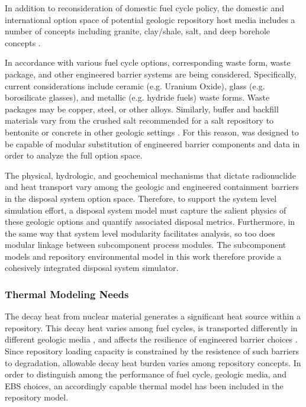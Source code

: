 

In addition to reconsideration of domestic fuel cycle policy, the domestic and 
international option space of potential geologic repository host media includes 
a number of concepts including granite, clay/shale, salt, and deep borehole 
concepts \cite{nutt_used_2010}. 


In accordance with various fuel cycle options, corresponding waste form, waste 
package, and other engineered barrier systems are being considered.  
Specifically, current considerations include ceramic (e.g.  Uranium Oxide), 
glass (e.g.  borosilicate glasses), and metallic (e.g.  hydride fuels) waste 
forms. Waste packages may be copper, steel, or other alloys. Similarly, buffer 
and backfill materials vary from the crushed salt recommended for a salt 
repository \cite{hardin_generic_2011} to bentonite or concrete in other 
geologic settings \cite{andra_argile:_2005}. For this reason, \Cyder
was designed to be capable of modular substitution of engineered barrier 
components and data in order to analyze the full option space.


The physical, hydrologic, and geochemical mechanisms that dictate 
radionuclide and heat transport vary among the geologic and engineered 
containment barriers in the disposal system option space.  Therefore, 
to support the system level simulation effort, a disposal system model must
capture the salient physics of these geologic options and quantify associated 
disposal metrics.  Furthermore, in the same way that system level 
modularity facilitates analysis, so too does modular linkage between subcomponent 
process modules. The subcomponent models and repository environmental model in 
this work therefore provide a cohesively integrated disposal system simulator.


\subsubsection{Thermal Modeling Needs}
The decay heat from nuclear material generates a significant heat source within 
a repository. This decay heat varies among fuel cycles, is transported  
differently in different geologic media \cite{greenberg_application_2012}, and 
affects the resilience of engineered barrier choices \cite{andra_argile:_2005}. 
Since repository loading capacity is constrained by the resistence of such 
barriers to degradation, allowable decay heat burden varies among repository 
concepts. In order to distinguish among the performance of fuel 
cycle, geologic media, and \gls{EBS} choices, an accordingly capable thermal 
model has been included in the repository model. 

